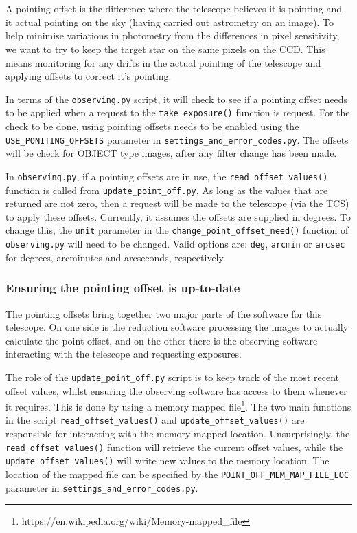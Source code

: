 \documentclass[a4paper,12pt]{article}
\newcommand{\observing}{\tt{observing.py}}
\begin{document}
\\
\\
A pointing offset is the difference where the telescope believes it is pointing and it actual pointing on the sky (having carried out astrometry on an image). To help minimise variations in photometry from the differences in pixel sensitivity, we want to try to keep the target star on the same pixels on the CCD. This means monitoring for any drifts in the actual pointing of the telescope and applying offsets to correct it's pointing.

In terms of the {\tt observing.py} script, it will check to see if a pointing offset needs to be applied when a request to the {\tt take\_exposure()} function is request. For the check to be done, using pointing offsets needs to be enabled using the {\tt USE\_PONITING\_OFFSETS} parameter in {\tt settings\_and\_error\_codes.py}. The offsets will be check for OBJECT type images, after any filter change has been made.

In {\observing}, if a pointing offsets are in use, the {\tt read\_offset\_values()} function is called from {\tt update\_point\_off.py}. As long as the values that are returned are not zero, then a request will be made to the telescope (via the TCS) to apply these offsets. Currently, it assumes the offsets are supplied in degrees. To change this, the {\tt unit} parameter in the {\tt change\_point\_offset\_need()} function of {\observing} will need to be changed. Valid options are: {\tt deg}, {\tt arcmin} or {\tt arcsec} for degrees, arcminutes and arcseconds, respectively.

\subsubsection{Ensuring the pointing offset is up-to-date}

The pointing offsets bring together two major parts of the software for this telescope. On one side is the reduction software processing the images to actually calculate the point offset, and on the other there is the observing software interacting with the telescope and requesting exposures.

The role of the {\tt update\_point\_off.py} script is to keep track of the most recent offset values, whilst ensuring the observing software has access to them whenever it requires. This is done by using a memory mapped file{\footnote{https://en.wikipedia.org/wiki/Memory-mapped\_file}}. The two main functions in the script {\tt read\_offset\_values()} and {\tt update\_offset\_values()} are responsible for interacting with the memory mapped location. Unsurprisingly, the {\tt read\_offset\_values()} function will retrieve the current offset values, while the {\tt update\_offset\_values()} will write new values to the memory location. The location of the mapped file can be specified by the {\tt POINT\_OFF\_MEM\_MAP\_FILE\_LOC} parameter in {\tt settings\_and\_error\_codes.py}.
\end{document}
